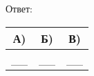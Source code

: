 \sepline
Ответ:
\begin{tabular}{|c|c|c|}
\hline
А) & Б) & В) \\
\hline
__ & __ & __ \\
\hline
\end{tabular}
